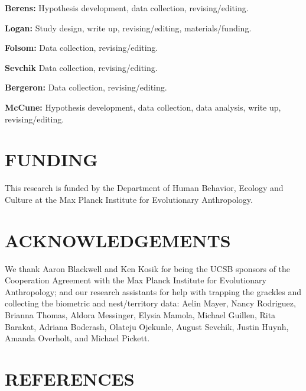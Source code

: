 \documentclass[
]{article}
\begin{document}
\textbf{Berens:} Hypothesis development, data collection,
revising/editing.

\textbf{Logan:} Study design, write up, revising/editing,
materials/funding.

\textbf{Folsom:} Data collection, revising/editing.

\textbf{Sevchik} Data collection, revising/editing.

\textbf{Bergeron:} Data collection, revising/editing.

\textbf{McCune:} Hypothesis development, data collection, data analysis,
write up, revising/editing.

\hypertarget{funding}{%
\section{FUNDING}\label{funding}}

This research is funded by the Department of Human Behavior, Ecology and
Culture at the Max Planck Institute for Evolutionary Anthropology.

\hypertarget{acknowledgements}{%
\section{ACKNOWLEDGEMENTS}\label{acknowledgements}}

We thank Aaron Blackwell and Ken Kosik for being the UCSB sponsors of
the Cooperation Agreement with the Max Planck Institute for Evolutionary
Anthropology; and our research assistants for help with trapping the
grackles and collecting the biometric and nest/territory data: Aelin
Mayer, Nancy Rodriguez, Brianna Thomas, Aldora Messinger, Elysia Mamola,
Michael Guillen, Rita Barakat, Adriana Boderash, Olateju Ojekunle,
August Sevchik, Justin Huynh, Amanda Overholt, and Michael Pickett.

\hypertarget{references}{%
\section*{REFERENCES}\label{references}}
\end{document}
